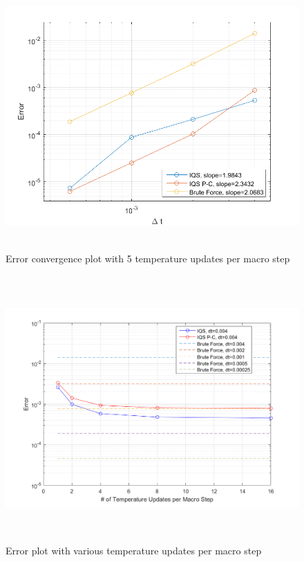 \documentclass[11pt]{scrartcl}
\begin{document}
\begin{figure}[H]
\centering
\includegraphics[height=4in]{mp_figs/lra_mp_convergence.png}
\caption{Error convergence plot with 5 temperature updates per macro step}
\label{fig:conv}
\end{figure}

\begin{figure}[H]
\centering
\includegraphics[height=4in]{mp_figs/lra_mp.png}
\caption{Error plot with various temperature updates per macro step}
\label{fig:mp}
\end{figure}

\end{document}
